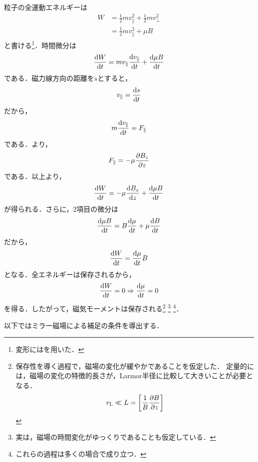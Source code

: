 \documentclass{report}
\begin{document}
        粒子の全運動エネルギーは
        \begin{align}
          W &= \frac{1}{2}mv_{\parallel}^2 + \frac{1}{2}mv_{\perp}^2\\
          &= \frac{1}{2}mv_{\parallel}^2 + \mu B
        \end{align}
        と書ける\footnote{変形にはを用いた．}．時間微分は
        \begin{align}
          \dv{W}{t} = mv_{\parallel}\dv{v_{\parallel}}{t} + \dv{\mu B}{t}
        \end{align}
        である．磁力線方向の距離を$s$とすると，
        \begin{align}
          v_\parallel = \dv{s}{t}
        \end{align}
        だから，
        \begin{align}
          m \dv{v_\parallel}{t} = F_\parallel
        \end{align}
        である．より，
        \begin{align}
          F_\parallel = -\mu \pdv{B_z}{z}
        \end{align}
        である．以上より，
        \begin{align}
          \dv{W}{t} = -\mu \dv{B_z}{z} + \dv{\mu B}{t}
        \end{align}
        が得られる．さらに，2項目の微分は
        \begin{align}
          \dv{\mu B}{t} = B\dv{\mu}{t} + \mu \dv{B}{t}
        \end{align}
        だから，
        \begin{align}
          \dv{W}{t} = \dv{\mu}{t}B
        \end{align}
        となる．全エネルギーは保存されるから，
        \begin{align}
          \dv{W}{t} = 0 \Rightarrow \dv{\mu}{t} = 0
        \end{align}
        を得る．したがって，磁気モーメントは保存される\footnote{保存性を導く過程で，磁場の変化が緩やかであることを仮定した．
        定量的には，磁場の変化の特徴的長さが，Larmor半径に比較して大きいことが必要となる．
        \begin{align}
          r_{\mathrm{L}} \ll L = \qty[\frac{1}{B}\pdv{B}{z}]
        \end{align}
        }
        \footnote{実は，磁場の時間変化がゆっくりであることも仮定している．}
        \footnote{これらの過程は多くの場合で成り立つ．}．

        以下ではミラー磁場による補足の条件を導出する．
        
\end{document}
